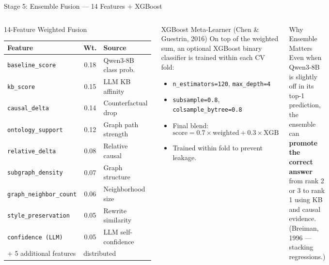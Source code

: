 ﻿\documentclass[aspectratio=169,10pt]{beamer}
\begin{document}
\begin{frame}[shrink=4]{Stage 5: Ensemble Fusion --- 14 Features + XGBoost}
\begin{columns}[T]
\begin{block}{14-Feature Weighted Fusion}
\footnotesize
\setlength{\tabcolsep}{3pt}
\renewcommand{\arraystretch}{1.15}
\begin{tabular}{p{3.5cm}cl}
\toprule
\textbf{Feature} & \textbf{Wt.} & \textbf{Source}\\
\midrule
\texttt{baseline\_score} & 0.18 & Qwen3-8B class prob.\\
\texttt{kb\_score} & 0.15 & LLM KB affinity\\
\texttt{causal\_delta} & 0.14 & Counterfactual drop\\
\texttt{ontology\_support} & 0.12 & Graph path strength\\
\texttt{relative\_delta} & 0.08 & Relative causal\\
\texttt{subgraph\_density} & 0.07 & Graph structure\\
\texttt{graph\_neighbor\_count} & 0.06 & Neighborhood size\\
\texttt{style\_preservation} & 0.05 & Rewrite similarity\\
\texttt{confidence (LLM)} & 0.05 & LLM self-confidence\\
+ 5 additional features & \multicolumn{2}{l}{distributed}\\
\bottomrule
\end{tabular}
\end{block}
\begin{block}{XGBoost Meta-Learner (Chen \& Guestrin, 2016)}
On top of the weighted sum, an optional XGBoost binary classifier is trained within each CV fold:
\begin{itemize}
  \item \texttt{n\_estimators=120}, \texttt{max\_depth=4}
  \item \texttt{subsample=0.8}, \texttt{colsample\_bytree=0.8}
  \item Final blend:
  \[
    \text{score} = 0.7 \times \text{weighted} + 0.3 \times \text{XGB}
  \]
  \item Trained within fold to prevent leakage.
\end{itemize}
\end{block}
\vspace{6pt}
\begin{block}{Why Ensemble Matters}
Even when Qwen3-8B is slightly off in its top-1 prediction, the ensemble can \textbf{promote the correct answer} from rank 2 or 3 to rank 1 using KB and causal evidence. (Breiman, 1996 --- stacking regressions.)
\end{block}
\end{columns}
\end{frame}
\end{document}
